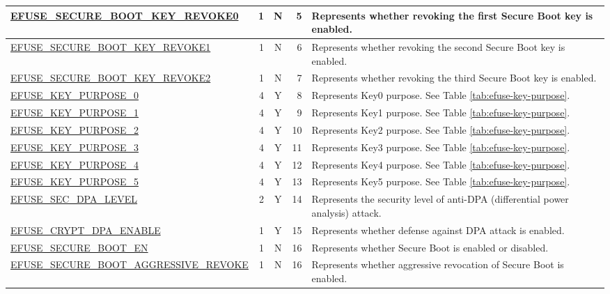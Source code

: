 \begin{longtable}[l]{ |m{8.2cm}|r|c|r|m{9cm}| }
    \hline
    \hyperref[fielddesc:EFUSESECUREBOOTKEYREVOKE0]{EFUSE\_SECURE\_BOOT\_KEY\_REVOKE0} & 1 & N & 5 & Represents whether revoking the first Secure Boot key is enabled.\\
    \hline
    \hyperref[fielddesc:EFUSESECUREBOOTKEYREVOKE1]{EFUSE\_SECURE\_BOOT\_KEY\_REVOKE1} & 1 & N & 6 & Represents whether revoking the second Secure Boot key is enabled.\\
    \hline
    \hyperref[fielddesc:EFUSESECUREBOOTKEYREVOKE2]{EFUSE\_SECURE\_BOOT\_KEY\_REVOKE2} & 1 & N & 7 & Represents whether revoking the third Secure Boot key is enabled.\\
    \hline
    \hyperref[fielddesc:EFUSEKEYPURPOSE0]{EFUSE\_KEY\_PURPOSE\_0} & 4 & Y & 8 & {Represents Key0 purpose. See Table \ref{tab:efuse-key-purpose}.} \\
    \hline
    \hyperref[fielddesc:EFUSEKEYPURPOSE1]{EFUSE\_KEY\_PURPOSE\_1} & 4 & Y & 9 & {Represents Key1 purpose. See Table \ref{tab:efuse-key-purpose}.} \\
    \hline
    \hyperref[fielddesc:EFUSEKEYPURPOSE2]{EFUSE\_KEY\_PURPOSE\_2} & 4 & Y & 10 & {Represents Key2 purpose. See Table \ref{tab:efuse-key-purpose}.} \\ 
    \hline
    \hyperref[fielddesc:EFUSEKEYPURPOSE3]{EFUSE\_KEY\_PURPOSE\_3} & 4 & Y & 11 & {Represents Key3 purpose. See Table \ref{tab:efuse-key-purpose}.} \\    
    \hline
    \hyperref[fielddesc:EFUSEKEYPURPOSE4]{EFUSE\_KEY\_PURPOSE\_4} & 4 & Y & 12 & {Represents Key4 purpose. See Table \ref{tab:efuse-key-purpose}.} \\    
    \hline
    \hyperref[fielddesc:EFUSEKEYPURPOSE5]{EFUSE\_KEY\_PURPOSE\_5} & 4 & Y & 13 & {Represents Key5 purpose. See Table \ref{tab:efuse-key-purpose}.} \\  
    \hline
    \hyperref[fielddesc:EFUSESECDPALEVEL]{EFUSE\_SEC\_DPA\_LEVEL} & 2 & Y & 14 & Represents the security level of anti-DPA (differential power analysis) attack. \\ 
    \hline
    \hyperref[fielddesc:EFUSECRYPTDPAENABLE]{EFUSE\_CRYPT\_DPA\_ENABLE} & 1 & Y & 15 & Represents whether defense against DPA attack is enabled. \\ 
    \hline
    \hyperref[fielddesc:EFUSESECUREBOOTEN]{EFUSE\_SECURE\_BOOT\_EN} & 1 & N & 16 & Represents whether Secure Boot is enabled or disabled. \\ 
    \hline
    \hyperref[fielddesc:EFUSESECUREBOOTAGGRESSIVEREVOKE]{EFUSE\_SECURE\_BOOT\_AGGRESSIVE\_REVOKE} & 1 & N & 16 & Represents whether aggressive revocation of Secure Boot is enabled. \\

\end{longtable}
